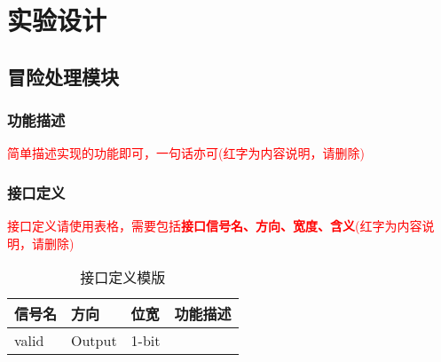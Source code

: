 \section{实验设计}
\subsection{冒险处理模块}\label{sub:hazard}
\subsubsection{功能描述}
\textcolor{red}{简单描述实现的功能即可，一句话亦可(红字为内容说明，请删除)}
\subsubsection{接口定义}
\textcolor{red}{接口定义请使用表格，需要包括\textbf{接口信号名、方向、宽度、含义}(红字为内容说明，请删除)}

\begin{table}[htp]
\caption{接口定义模版}\label{tab:signaldef}
\begin{center}
	\begin{tabular}{|l|l|l|p{6cm}|}
	\hline
	\textbf{信号名} & \textbf{方向} & \textbf{位宽} & \textbf{功能描述}\\ \hline \hline
	valid			& Output& 1-bit & \\ 
	\hline
	\end{tabular}
\end{center}
\end{table}
